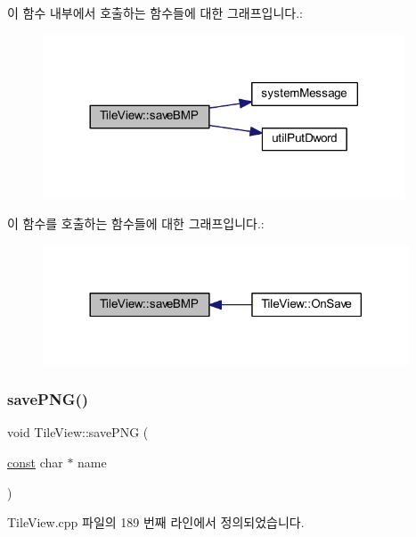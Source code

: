 이 함수 내부에서 호출하는 함수들에 대한 그래프입니다.\+:
\nopagebreak
\begin{figure}[H]
\begin{center}
\leavevmode
\includegraphics[width=305pt]{class_tile_view_aaea86e952981c5622d400ffb57b30480_cgraph}
\end{center}
\end{figure}
이 함수를 호출하는 함수들에 대한 그래프입니다.\+:
\nopagebreak
\begin{figure}[H]
\begin{center}
\leavevmode
\includegraphics[width=308pt]{class_tile_view_aaea86e952981c5622d400ffb57b30480_icgraph}
\end{center}
\end{figure}
\mbox{\label{class_tile_view_a43f168cd426f0e9215f55c742b6826e7}} 
\subsubsection{\texorpdfstring{save\+P\+N\+G()}{savePNG()}}
{\footnotesize\ttfamily void Tile\+View\+::save\+P\+NG (\begin{DoxyParamCaption}\item[{\mbox{\hyperlink{getopt1_8c_a2c212835823e3c54a8ab6d95c652660e}{const}} char $\ast$}]{name }\end{DoxyParamCaption})}



Tile\+View.\+cpp 파일의 189 번째 라인에서 정의되었습니다.


